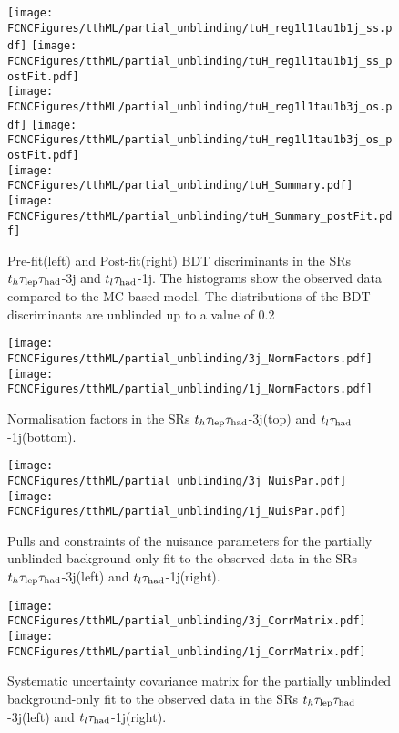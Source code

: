 \begin{figure}[H]
\centering
\texttt{[image: \\FCNCFigures/tthML/partial\_unblinding/tuH\_reg1l1tau1b1j\_ss.pdf]}
\texttt{[image: \\FCNCFigures/tthML/partial\_unblinding/tuH\_reg1l1tau1b1j\_ss\_postFit.pdf]}
\\
\texttt{[image: \\FCNCFigures/tthML/partial\_unblinding/tuH\_reg1l1tau1b3j\_os.pdf]}
\texttt{[image: \\FCNCFigures/tthML/partial\_unblinding/tuH\_reg1l1tau1b3j\_os\_postFit.pdf]}
\\
\texttt{[image: \\FCNCFigures/tthML/partial\_unblinding/tuH\_Summary.pdf]}
\texttt{[image: \\FCNCFigures/tthML/partial\_unblinding/tuH\_Summary\_postFit.pdf]}
\caption{Pre-fit(left) and Post-fit(right) BDT discriminants in the SRs $t_h\tau_\text{lep}{}\tau_\text{had}$-3j and $t_l\tau_\text{had}$-1j. The histograms show the observed data compared to the MC-based model. The distributions of the BDT discriminants are unblinded up to a value of 0.2}
\label{fig:tthML_partial_unblinding_tuH}
\end{figure}




\begin{figure}[H]
\centering
\texttt{[image: \\FCNCFigures/tthML/partial\_unblinding/3j\_NormFactors.pdf]}
\texttt{[image: \\FCNCFigures/tthML/partial\_unblinding/1j\_NormFactors.pdf]}
\\
\caption{Normalisation factors in the SRs $t_h\tau_\text{lep}{}\tau_\text{had}$-3j(top) and $t_l\tau_\text{had}$-1j(bottom). }
\label{fig:tthML_partial_unblinding_NF}
\end{figure}



\newpage

\begin{figure}[H]
\centering
\texttt{[image: \\FCNCFigures/tthML/partial\_unblinding/3j\_NuisPar.pdf]}
\texttt{[image: \\FCNCFigures/tthML/partial\_unblinding/1j\_NuisPar.pdf]}
\caption{Pulls and constraints of the nuisance parameters for the partially unblinded background-only fit to the observed data in the SRs $t_h\tau_\text{lep}{}\tau_\text{had}$-3j(left) and $t_l\tau_\text{had}$-1j(right).}
\label{fig:tthML_partial_unblinding_pull}
\end{figure}

\newpage

\begin{figure}[H]
\centering
\texttt{[image: \\FCNCFigures/tthML/partial\_unblinding/3j\_CorrMatrix.pdf]}
\texttt{[image: \\FCNCFigures/tthML/partial\_unblinding/1j\_CorrMatrix.pdf]}
\caption{Systematic uncertainty covariance matrix for the partially unblinded background-only fit to the observed data in the SRs $t_h\tau_\text{lep}{}\tau_\text{had}$-3j(left) and $t_l\tau_\text{had}$-1j(right).}
\label{fig:tthML_partial_unblinding_corre}
\end{figure}



